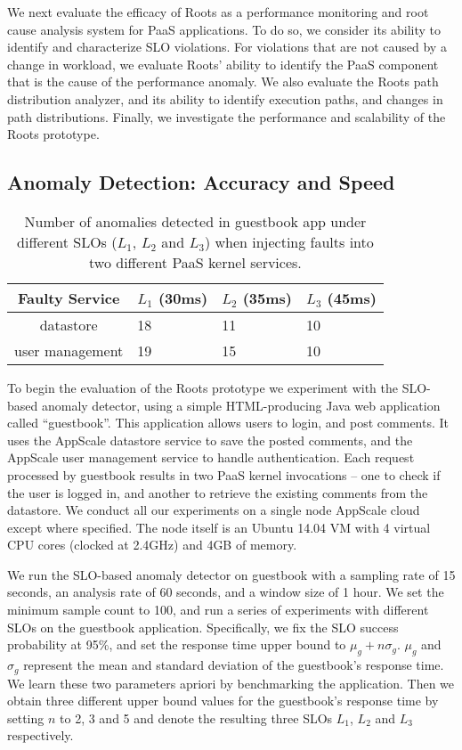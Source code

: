 We next evaluate the efficacy of Roots as a performance monitoring and root cause
analysis system for PaaS applications.
To do so, we consider its ability to identify and characterize SLO violations.
For violations that are not caused by a change in workload, we evaluate Roots' ability to identify
the PaaS component that is the cause of the performance anomaly. We also
evaluate the Roots path distribution analyzer, and its ability to identify
execution paths, and changes in path distributions.
Finally, we investigate the performance and scalability of the Roots
prototype. 

\subsection{Anomaly Detection: Accuracy and Speed}

\begin{table}
\begin{center}
\begin{tabular}{|c|p{1cm}|p{1cm}|p{1cm}|}
\hline
Faulty Service & $L_1$ (30ms) & $L_2$ (35ms) & $L_3$ (45ms) \\ \hline
datastore & 18 & 11 & 10 \\ \hline
user management & 19 & 15 & 10 \\ \hline
\end{tabular}
\end{center}
\caption{Number of anomalies detected in guestbook app under different SLOs 
($L_1$, $L_2$ and $L_3$) when injecting faults into two different PaaS kernel services.
\label{tab:anomaly_counts}
}
\end{table}

To begin the evaluation of the Roots prototype we experiment with
the SLO-based anomaly detector, using a simple HTML-producing Java 
web application called ``guestbook''.
This application allows users to login, and post comments. It uses the
AppScale  datastore service to save
the posted comments, and the AppScale user management service to handle authentication. Each request processed
by guestbook results in two PaaS kernel invocations -- one to check if the user is logged in, and 
another to retrieve the existing comments from the datastore. We conduct all
our experiments on a single node AppScale cloud except where specified. The node itself is an Ubuntu
14.04 VM with 4 virtual CPU cores (clocked at 2.4GHz) and 4GB of memory.

We run the SLO-based anomaly detector on guestbook with a sampling rate of 15 seconds, an analysis
rate of 60 seconds, and a window size of 1 hour. We set the minimum sample count to 100, and
run a series of experiments with different SLOs on the guestbook application. Specifically, we fix
the SLO success probability at 95\%, and set the response time upper bound to $\mu_g + n\sigma_g$. 
$\mu_g$ and $\sigma_g$ represent the mean and standard deviation of the
guestbook's response time. We learn these two parameters apriori by benchmarking
the application. Then we obtain three different upper bound values for the guestbook's
response time by setting 
$n$ to 2, 3 and 5 and denote the resulting three SLOs $L_1$, $L_2$ and $L_3$ respectively.

